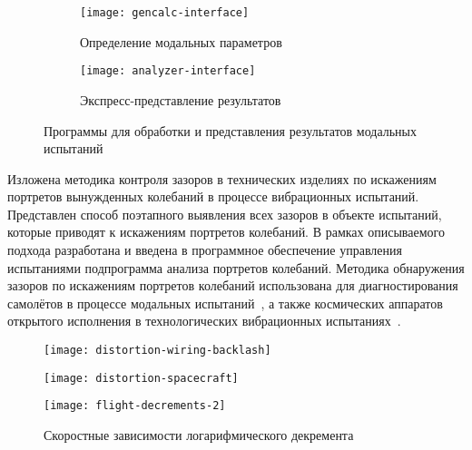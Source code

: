\begin{figure}[!htb]
	\centering
	\begin{subfigure}[t]{0.45\textwidth}
		\centering
		\texttt{[image: gencalc-interface]}
		\caption{\small Определение модальных параметров} \label{subfig:gencalc-interface}
	\end{subfigure}
	\hfill
	\begin{subfigure}[t]{0.52\textwidth}
		\centering
		\texttt{[image: analyzer-interface]}
		\caption{\small Экспресс-представление результатов} \label{subfig:analyzer-interface}
	\end{subfigure}
	\vspace{1em}
	\caption{Программы для обработки и представления результатов модальных испытаний} 
\end{figure}

Изложена методика контроля зазоров в технических изделиях по искажениям портретов вынужденных колебаний в процессе вибрационных испытаний. Представлен способ поэтапного выявления всех зазоров в объекте испытаний, которые приводят к искажениям портретов колебаний. В рамках описываемого подхода разработана и введена в программное обеспечение управления испытаниями подпрограмма анализа портретов колебаний. Методика обнаружения зазоров по искажениям портретов колебаний использована для диагностирования самолётов в процессе модальных испытаний~, а также космических аппаратов открытого исполнения в технологических вибрационных испытаниях~. 

\begin{figure}[!htb]
	\centering
	\begin{minipage}{0.59\textwidth}
		\centering
		\texttt{[image: distortion-wiring-backlash]} 
		 \label{fig:distortion-wiring-backlash}
	\end{minipage}
	\hfill
	\begin{minipage}{0.4\textwidth}
		\centering
		\texttt{[image: distortion-spacecraft]}
		 \label{fig:distortion-spacecraft}
	\end{minipage}
	\vspace{1em}
\end{figure}

\begin{wrapfigure}[14]{r}{0.48\textwidth}
	\begin{center}
		\vspace{-1em}
		\texttt{[image: flight-decrements-2]}
	    \caption{Скоростные зависимости логарифмического декремента} \label{fig:flight-decrements}
	\end{center}
\end{wrapfigure}


